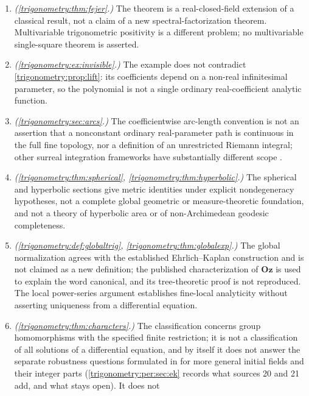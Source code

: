 \documentclass[11pt,letterpaper]{article}
\numberwithin{equation}{section}
\theoremstyle{definition}
\theoremstyle{remark}
\newcommand{\Oz}{\mathbf{Oz}}
\begin{document}
\begin{enumerate}
 series; infinitely many ordinary Fourier summands at one Hahn exponent do not form a strongly
 summable family merely because the corresponding real series converges. The Dirichlet and
 Fej\'er kernel identities are exact algebraic statements, not a fine-topological approximation
 theorem.
\item \emph{(\cref{trigonometry:thm:fejer}.)} The theorem is a real-closed-field extension of a
 classical result, not a claim of a new spectral-factorization theorem. Multivariable
 trigonometric positivity is a different problem; no multivariable single-square theorem is
 asserted.
\item \emph{(\cref{trigonometry:ex:invisible}.)} The example does not contradict
 \cref{trigonometry:prop:lift}: its coefficients depend on a non-real infinitesimal parameter, so
 the polynomial is not a single ordinary real-coefficient analytic function.
\item \emph{(\cref{trigonometry:sec:arcs}.)} The coefficientwise arc-length convention is not an
 assertion that a nonconstant ordinary real-parameter path is continuous in the full fine topology,
 nor a definition of an unrestricted Riemann integral; other surreal integration frameworks have
 substantially different scope \cite{CE}.
\item \emph{(\cref{trigonometry:thm:spherical}, \cref{trigonometry:thm:hyperbolic}.)} The spherical
 and hyperbolic sections give metric identities under explicit nondegeneracy hypotheses, not a
 complete global geometric or measure-theoretic foundation, and not a theory of hyperbolic area or
 of non-Archimedean geodesic completeness.
\item \emph{(\cref{trigonometry:def:globaltrig}, \cref{trigonometry:thm:globalexp}.)} The global
 normalization agrees with the established Ehrlich--Kaplan construction and is not claimed as a new
 definition; the published characterization of $\Oz$ is used to explain the word canonical, and its
 tree-theoretic proof is not reproduced. The local power-series argument establishes fine-local
 analyticity without asserting uniqueness from a differential equation.
\item \emph{(\cref{trigonometry:thm:characters}.)} The classification concerns group homomorphisms
 with the specified finite restriction; it is not a classification of all solutions of a
 differential equation, and by itself it does not answer the separate robustness questions
 formulated in \cite[\S11]{EK} for more general initial fields and their integer parts
 (\cref{trigonometry:per:sec:ek} records what sources 20 and 21 add, and what stays open). It does not

\end{enumerate}
\end{document}
